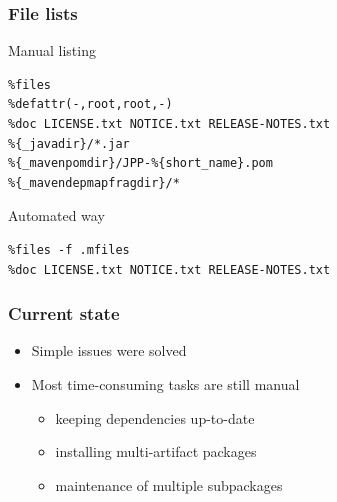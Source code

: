 \documentclass[pdftex,unicode,xcolor=table]{beamer}
\begin{document}
\begin{frame}[fragile]
  \scriptsize
\frametitle{File lists}
  \begin{block}{Manual listing}
\begin{verbatim}
%files
%defattr(-,root,root,-)
%doc LICENSE.txt NOTICE.txt RELEASE-NOTES.txt
%{_javadir}/*.jar
%{_mavenpomdir}/JPP-%{short_name}.pom
%{_mavendepmapfragdir}/*
\end{verbatim}
\end{block}

  \begin{block}{Automated way}
\begin{verbatim}
%files -f .mfiles
%doc LICENSE.txt NOTICE.txt RELEASE-NOTES.txt
\end{verbatim}
\end{block}
\end{frame}

\begin{frame}
  \frametitle{Current state}
  \begin{itemize}
    \item Simple issues were solved
    \item Most time-consuming tasks are still manual
    \begin{itemize}
      \item keeping dependencies up-to-date
      \item installing multi-artifact packages
      \item maintenance of multiple subpackages
    \end{itemize}
  \end{itemize}
\end{frame}
\end{document}
